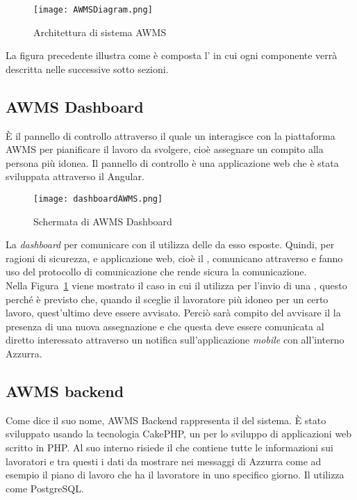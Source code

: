  \begin{figure}[h]
 	\begin{center}
 		\texttt{[image: AWMSDiagram.png]}
 		\caption{Architettura di sistema AWMS}\label{fig:arch}
 	\end{center}
 \end{figure}
La figura precedente illustra come è composta l' in cui ogni componente verrà descritta nelle successive sotto sezioni.
\begin{trivlist}
	\item \subsection{AWMS Dashboard}
	È il pannello di controllo attraverso il quale un  interagisce con la piattaforma \gls{AWMS} per pianificare il lavoro da svolgere, cioè assegnare un compito alla persona più idonea. Il pannello di controllo è una applicazione web che è stata sviluppata attraverso il  Angular.
	\begin{figure}[h] 
		\begin{center}
			\texttt{[image: dashboardAWMS.png]}
			\caption{Schermata di AWMS Dashboard}
		\end{center}
	\end{figure}
	 	La \emph{dashboard} per comunicare con il  utilizza delle  da esso esposte. Quindi, per ragioni di sicurezza,  e applicazione web, cioè il , comunicano attraverso  e fanno uso del protocollo di comunicazione  che rende sicura la comunicazione. \\
	 	Nella Figura~\ref{fig:arch} viene mostrato il caso in cui il  utilizza  per l'invio di una , questo perché è previsto che, quando il  sceglie il lavoratore più idoneo per un certo lavoro, quest'ultimo deve essere avvisato. Perciò sarà compito del  avvisare il  la presenza di una nuova assegnazione e che questa deve essere comunicata al diretto interessato attraverso un notifica sull'applicazione \emph{mobile} con all'interno Azzurra.
	\item \subsection{AWMS backend}
	Come dice il suo nome, AWMS Backend rappresenta il  del sistema. È stato sviluppato usando la tecnologia CakePHP, un  per lo sviluppo di applicazioni web scritto in \gls{PHP}. Al suo interno risiede il  che contiene tutte le informazioni sui lavoratori e tra questi i dati da mostrare nei messaggi di Azzurra come ad esempio il piano di lavoro che ha il lavoratore in uno specifico giorno. Il  utilizza come  PostgreSQL. \\
	

\end{trivlist}
